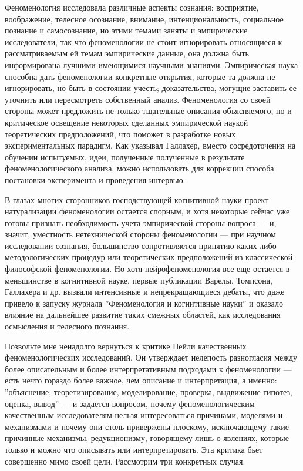 \documentclass[11pt]{book}
\begin{document}
Феноменология исследовала различные аспекты сознания: восприятие, воображение, телесное осознание, внимание, интенциональность, социальное познание и самосознание, но этими темами заняты и эмпирические исследователи, так что феноменологии не стоит игнорировать относящиеся к рассматриваемым ей темам эмпирические данные, она должна быть информирована лучшими имеющимися научными знаниями. Эмпирическая наука способна дать феноменологии конкретные открытия, которые та должна не игнорировать, но быть в состоянии учесть; доказательства, могущие заставить ее уточнить или пересмотреть собственный анализ. Феноменология со своей стороны может предложить не только тщательные описания объясняемого, но и критическое освещение некоторых сделанных эмпирической наукой теоретических предположений, что поможет в разработке новых экспериментальных парадигм. Как указывал Галлахер, вместо сосредоточения на обучении испытуемых, идеи, полученные полученные в результате феноменологического анализа, можно использовать для коррекции способа постановки эксперимента и проведения интервью.

В глазах многих сторонников господствующей когнитивной науки проект натурализации феноменологии остается спорным, и хотя некоторые сейчас уже готовы признать необходимость учета эмпирической стороны вопроса --- и, значит, уместность нетехнической стороны феноменологии --- при научном исследовании сознания, большинство сопротивляется принятию каких-либо методологических процедур или теоретических предположений из классической философской феноменологии. Но хотя нейрофеноменология все еще остается в меньшинстве в когнитивной науке, первые публикации Варелы, Томпсона, Галлахера и др. вызвали интенсивные и непрекращающиеся дебаты, что даже привело к запуску журнала ''Феноменология и когнитивные науки'' и оказало влияние на дальнейшее развитие таких смежных областей, как исследования осмысления и телесного познания.

Позвольте мне ненадолго вернуться к критике Пейли качественных феноменологических исследований. Он утверждает нелепость разногласия между более описательным и более интерпретативным подходами к феноменологии --- есть нечто гораздо более важное, чем описание и интерпретация, а именно: ''объяснение, теоретизирование, моделирование, проверка, выдвижение гипотез, оценка, вывод'' --- и задается вопросом, почему феноменологическим качественным исследователям нельзя интересоваться причинами, моделями и механизмами и почему они столь привержены плоскому, исключающему такие причинные механизмы, редукционизму, говорящему лишь о явлениях, которые только и можно что описывать или интерпретировать. Эта критика бьет совершенно мимо своей цели. Рассмотрим три конкретных случая.
\end{document}
